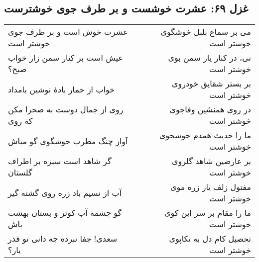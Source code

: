 \begin{center}
\section*{غزل ۶۹: عشرت خوشست و بر طرف جوی خوشترست}
\label{sec:069}
\begin{longtable}{l p{0.5cm} r}
عشرت خوش است و بر طرف جوی خوشتر است
&&
می بر سماع بلبل خوشگوی خوشتر است
\\
عیش است بر کنار سمن زار خواب صبح؟
&&
نی، در کنار یار سمن بوی خوشتر است
\\
خواب از خمار بادهٔ نوشین بامداد
&&
بر بستر شقایق خودروی خوشتر است
\\
روی از جمال دوست به صحرا مکن که روی
&&
در روی همنشین وفاجوی خوشتر است
\\
آواز چنگ مطرب خوشگوی گو مباش
&&
ما را حدیث همدم خوشخوی خوشتر است
\\
گر شاهد است سبزه بر اطراف گلستان
&&
بر عارضین شاهد گلروی خوشتر است
\\
آب از نسیم باد زره روی گشته گیر
&&
مفتول زلف یار زره موی خوشتر است
\\
گو چشمه آب کوثر و بستان بهشت باش
&&
ما را مقام بر سر این کوی خوشتر است
\\
سعدی! جفا نبرده چه دانی تو قدر یار؟
&&
تحصیل کام دل به تکاپوی خوشتر است
\\
\end{longtable}
\end{center}

